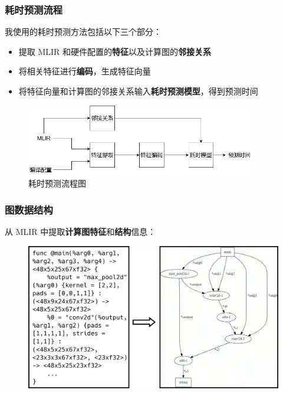 \documentclass[notes=beamer]{ctexbeamer}
\begin{document}
\begin{frame}[b]
  \frametitle{耗时预测流程}
  我使用的耗时预测方法包括以下三个部分：
  \begin{itemize}
    \item 提取 MLIR 和硬件配置的\textbf{特征}以及计算图的\textbf{邻接关系}
    \item 将相关特征进行\textbf{编码}，生成特征向量
    \item 将特征向量和计算图的邻接关系输入\textbf{耗时预测模型}，得到预测时间
  \end{itemize}
  \begin{figure}[h]
    \centering
    \includegraphics[width=0.9\textwidth]{figures/model_overall.png}
    \caption{耗时预测流程图}
  \end{figure}
\end{frame}

\begin{frame}[b]
  \frametitle{图数据结构}
  从 MLIR 中提取\textbf{计算图特征}和\textbf{结构}信息：
  \begin{figure}[h]
    \centering
    \includegraphics[width=1\textwidth]{figures/encode.png}
  \end{figure}
\end{frame}
\end{document}
